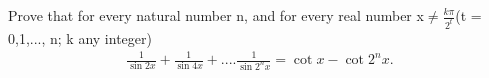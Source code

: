 \item Prove that for every natural number n, and for every real number x$\neq \frac{k\pi}{2^t}$(t = 0,1,..., n; k any integer)
\begin{align*}
\frac{1}{\sin{2x}} + \frac{1}{\sin{4x}}+....\frac{1}{\sin{2^{n}x}} = \cot{x} - \cot{2^{n}x}.
\end{align*}


